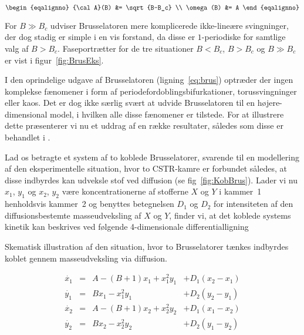 \begin{subequations}
 \begin{eqalignno}
  {\cal A}(B) &= \sqrt{B-B_c}  \\
  \omega(B)   &= A
 \end{eqalignno}
\end{subequations}

For $B \gg B_c$ udviser Brusselatoren mere komplicerede
ikke-line{\ae}re svingninger, der dog stadig er simple i en
vis forstand, da disse er $1$-periodiske for samtlige valg
af $B>B_c$. Faseportr{\ae}tter for de tre situationer
$B<B_c$, $B>B_c$ og $B \gg B_c$ er vist i
figur~\ref{fig:BrusEks}.

\vspace{4.0mm}
I den oprindelige udgave af Brusselatoren
(lig\-ning~\ref{eq:brus}) optr{\ae}der der ingen komplekse
f{\ae}nomener i form af periodefordoblings\-bifurkationer,
to\-rus\-svingninger eller kaos. Det er dog ikke s{\ae}rlig
sv{\ae}rt at udvide Brusselatoren til en
h{\o}jere-dimensional model, i hvilken alle disse
f{\ae}nomener er tilstede. For at illustrere dette
pr{\ae}senterer vi nu et uddrag af en r{\ae}kke resultater,
s{\aa}ledes som disse er behandlet i \cite{Marek2}.

\vspace{4.0mm}
Lad os betragte et sy\-stem af to koblede Brusselatorer,
svarende til en model\-lering af den eksperimentelle
situation, hvor to CSTR-kamre er forbundet s{\aa}ledes, at
disse indbyrdes kan udveksle stof ved diffusion (se
fig~\ref{fig:KobBrus}). Lader vi nu $x_1$, $y_1$ og $x_2$,
$y_2$ v{\ae}re koncentrationerne af stofferne $X$ og $Y$ i
kammer~1 henholdsvis kammer~2 og benyttes betegnelsen $D_1$
og $D_2$ for intensiteten af den diffusionsbestemte
masseudveksling af $X$ og $Y$, finder vi, at det koblede
sy\-stems kinetik kan beskrives ved f{\o}lgende
4-dimensionale differentiallig\-ning

{
 \vspace{0.5cm} 
 \small
  
 \vspace{-0.8cm}
}
{
\caption{\protect\capsize
	 Skematisk illustration af den situation, hvor to
	 Brusselatorer t{\ae}nkes indbyrdes koblet gennem 
	 masseudveksling via diffusion.}
\label{fig:KobBrus}
}

\begin{equation}
 \begin{array}{lcll}
  \dot{x_1} & = & A - (B+1)x_1 + x_1^2y_1 & + D_1(x_2-x_1)\\
  \dot{y_1} & = & Bx_1 - x_1^2y_1         & + D_2(y_2-y_1)\\
  \dot{x_2} & = & A - (B+1)x_2 + x_2^2y_2 & + D_1(x_1-x_2)\\
  \dot{y_2} & = & Bx_2 - x_2^2y_2         & + D_2(y_1-y_2)\\
 \end{array}
 \label{eq:KobletBrusEq}
\end{equation}


